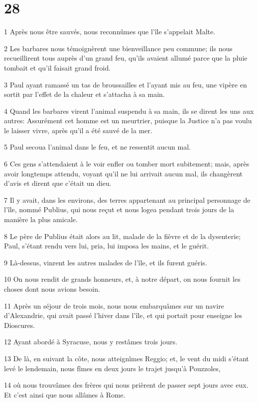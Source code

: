 \chapter{28}

\par 1 Après nous être sauvés, nous reconnûmes que l'île s'appelait Malte.
\par 2 Les barbares nous témoignèrent une bienveillance peu commune; ils nous recueillirent tous auprès d'un grand feu, qu'ils avaient allumé parce que la pluie tombait et qu'il faisait grand froid.
\par 3 Paul ayant ramassé un tas de broussailles et l'ayant mis au feu, une vipère en sortit par l'effet de la chaleur et s'attacha à sa main.
\par 4 Quand les barbares virent l'animal suspendu à sa main, ils se dirent les uns aux autres: Assurément cet homme est un meurtrier, puisque la Justice n'a pas voulu le laisser vivre, après qu'il a été sauvé de la mer.
\par 5 Paul secoua l'animal dans le feu, et ne ressentit aucun mal.
\par 6 Ces gens s'attendaient à le voir enfler ou tomber mort subitement; mais, après avoir longtemps attendu, voyant qu'il ne lui arrivait aucun mal, ils changèrent d'avis et dirent que c'était un dieu.
\par 7 Il y avait, dans les environs, des terres appartenant au principal personnage de l'île, nommé Publius, qui nous reçut et nous logea pendant trois jours de la manière la plus amicale.
\par 8 Le père de Publius était alors au lit, malade de la fièvre et de la dysenterie; Paul, s'étant rendu vers lui, pria, lui imposa les mains, et le guérit.
\par 9 Là-dessus, vinrent les autres malades de l'île, et ils furent guéris.
\par 10 On nous rendit de grands honneurs, et, à notre départ, on nous fournit les choses dont nous avions besoin.
\par 11 Après un séjour de trois mois, nous nous embarquâmes sur un navire d'Alexandrie, qui avait passé l'hiver dans l'île, et qui portait pour enseigne les Dioscures.
\par 12 Ayant abordé à Syracuse, nous y restâmes trois jours.
\par 13 De là, en suivant la côte, nous atteignîmes Reggio; et, le vent du midi s'étant levé le lendemain, nous fîmes en deux jours le trajet jusqu'à Pouzzoles,
\par 14 où nous trouvâmes des frères qui nous prièrent de passer sept jours avec eux. Et c'est ainsi que nous allâmes à Rome.
